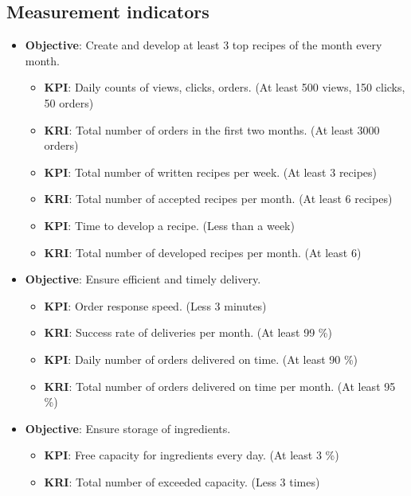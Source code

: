 \documentclass[11pt,a4paper]{article}
\begin{document}

\subsection{Measurement indicators}

\begin{itemize}
    \item \textbf{Objective}: Create and develop at least 3 top recipes of the month every month.
    \begin{itemize}
        \item \textbf{KPI}: Daily counts of views, clicks, orders. (At least 500 views, 150 clicks, 50 orders)
        \item \textbf{KRI}: Total number of orders in the first two months. (At least 3000 orders)
        \item \textbf{KPI}: Total number of written recipes per week. (At least 3 recipes)
        \item \textbf{KRI}: Total number of accepted recipes per month. (At least 6 recipes)
        \item \textbf{KPI}: Time to develop a recipe. (Less than a week)
        \item \textbf{KRI}: Total number of developed recipes per month. (At least 6)
    \end{itemize}
    \item \textbf{Objective}: Ensure efficient and timely delivery.
    \begin{itemize}
        \item \textbf{KPI}: Order response speed. (Less 3 minutes)
        \item \textbf{KRI}: Success rate of deliveries per month. (At least 99 \%)
        \item \textbf{KPI}: Daily number of orders delivered on time. (At least 90 \%)
        \item \textbf{KRI}: Total number of orders delivered on time per month. (At least 95 \%)
    \end{itemize}
    \item \textbf{Objective}: Ensure storage of ingredients.
    \begin{itemize}
        \item \textbf{KPI}: Free capacity for ingredients every day. (At least 3 \%)
        \item \textbf{KRI}: Total number of exceeded capacity. (Less 3 times)
    \end{itemize}

\end{itemize}
\end{document}
